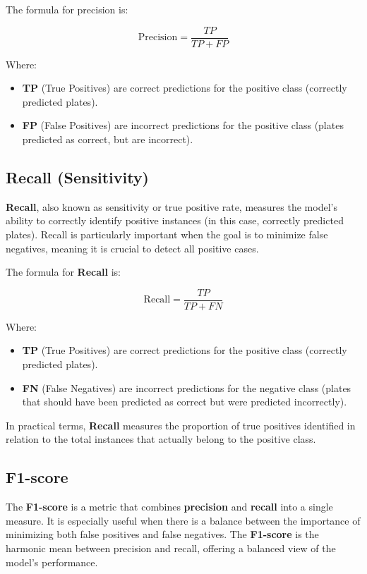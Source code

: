 \documentclass[conference]{IEEEtran}
\begin{document}
	The formula for precision is:
	
	\[
	\text{Precision} = \frac{TP}{TP + FP}
	\]
	
	Where:
	
	\begin{itemize}
		\item \textbf{TP} (True Positives) are correct predictions for the positive class (correctly predicted plates).
		\item \textbf{FP} (False Positives) are incorrect predictions for the positive class (plates predicted as correct, but are incorrect).
	\end{itemize}
	
	\subsection{Recall (Sensitivity)}
	
	\textbf{Recall}, also known as sensitivity or true positive rate, measures the model's ability to correctly identify positive instances (in this case, correctly predicted plates). Recall is particularly important when the goal is to minimize false negatives, meaning it is crucial to detect all positive cases.
	
	The formula for \textbf{Recall} is:
	
	\[
	\text{Recall} = \frac{TP}{TP + FN}
	\]
	
	Where:
	
	\begin{itemize}
		\item \textbf{TP} (True Positives) are correct predictions for the positive class (correctly predicted plates).
		\item \textbf{FN} (False Negatives) are incorrect predictions for the negative class (plates that should have been predicted as correct but were predicted incorrectly).
	\end{itemize}
	
	In practical terms, \textbf{Recall} measures the proportion of true positives identified in relation to the total instances that actually belong to the positive class.
	
	\subsection{F1-score}
	
	The \textbf{F1-score} is a metric that combines \textbf{precision} and \textbf{recall} into a single measure. It is especially useful when there is a balance between the importance of minimizing both false positives and false negatives. The \textbf{F1-score} is the harmonic mean between precision and recall, offering a balanced view of the model's performance.
	
\end{document}
